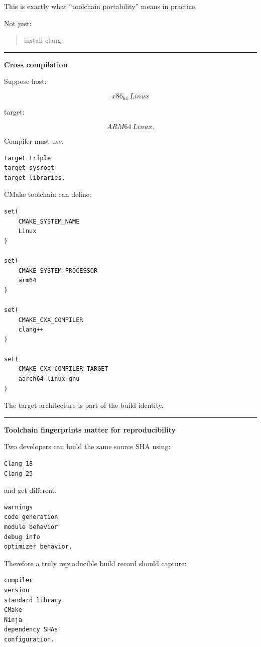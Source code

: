 This is exactly what ``toolchain portability'' means in practice.

Not just:

\begin{quote}
install clang.
\end{quote}

\begin{center}\rule{0.5\linewidth}{0.5pt}\end{center}

\textbf{Cross compilation}

Suppose host:

\[
x86_64\ Linux
\]

target:

\[
ARM64\ Linux.
\]

Compiler must use:

\begin{verbatim}
target triple
target sysroot
target libraries.
\end{verbatim}

CMake toolchain can define:

\begin{verbatim}
set(
    CMAKE_SYSTEM_NAME
    Linux
)

set(
    CMAKE_SYSTEM_PROCESSOR
    arm64
)

set(
    CMAKE_CXX_COMPILER
    clang++
)

set(
    CMAKE_CXX_COMPILER_TARGET
    aarch64-linux-gnu
)
\end{verbatim}

The target architecture is part of the build identity.

\begin{center}\rule{0.5\linewidth}{0.5pt}\end{center}

\textbf{Toolchain fingerprints matter for reproducibility}

Two developers can build the same source SHA using:

\begin{verbatim}
Clang 18
Clang 23
\end{verbatim}

and get different:

\begin{verbatim}
warnings
code generation
module behavior
debug info
optimizer behavior.
\end{verbatim}

Therefore a truly reproducible build record should capture:

\begin{verbatim}
compiler
version
standard library
CMake
Ninja
dependency SHAs
configuration.
\end{verbatim}

